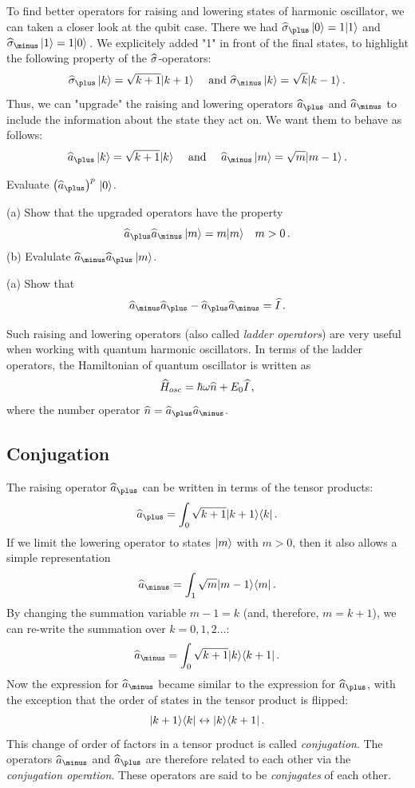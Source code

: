 To find better operators for raising and lowering states of harmonic oscillator, we can taken a closer look at the qubit case. There we had $\op{\sigma}_\plus\,\ket{0}=1\ket{1}$ and $\op{\sigma}_\minus\,\ket{1}=1\ket{0}$\,. We explicitely added "1" in front of the final states, to highlight the following property of the $\widehat{\sigma}$-operators:
\[
\op{\sigma}_\plus\,\ket{k}=\sqrt{k+1}\ket{k+1}\quad\textrm{ and } \op{\sigma}_\minus\,\ket{k}=\sqrt{k}\ket{k-1}\,.
\]
Thus, we can "upgrade" the raising and lowering operators $\op{a}_\plus$ and $\op{a}_\minus$ to include the information about the state they act on. We want them to behave as follows:
\[
\op{a}_\plus\,\ket{k}=\sqrt{k+1}\ket{k}\quad\textrm{ and }\quad \op{a}_\minus\,\ket{m}=\sqrt{m}\ket{m-1}\,.
\]
\begin{exercise}
	Evaluate $\left(\op{a}_\plus\right)^p\,\ket{0}$.
\end{exercise}
\begin{exercise}
	(a) Show that the upgraded operators have the property 
	\[
	\op{a}_\plus\op{a}_\minus\,\ket{m}=m\ket{m}\quad m>0\,.
	\]	
	(b) Evalulate $\op{a}_\minus\op{a}_\plus\,\ket{m}$.
\end{exercise}
\begin{exercise}
	(a) Show that 
	\[
	\op{a}_\minus\op{a}_\plus-\op{a}_\plus\op{a}_\minus=\op{I}\,.
	\]	
\end{exercise}

Such raising and lowering operators (also called \emph{ladder operators}) are very useful when working with quantum harmonic oscillators. In terms of the ladder operators, the Hamiltonian of quantum oscillator is written as
\[
\widehat{H}_{osc} = \hbar\omega\widehat{n}+E_0\widehat{I}\,,
\]
where the number operator $\op{n}=\op{a}_\plus\op{a}_\minus$. 


\subsection{Conjugation}
The raising operator $\op{a}_\plus$ can be written in terms of the tensor products:
\[
\op{a}_\plus=\int_0 \sqrt{k+1}\ketbra{k+1}{k}\,.
\]
If we limit the lowering operator to states $|{m}\rangle$ with $m>0$, then it also allows a simple representation
\[
\op{a}_\minus=\int_1 \sqrt{m}\ketbra{m-1}{m}\,.
\]
By changing the summation variable $m-1=k$ (and, therefore, $m=k+1$), we can re-write the summation over $k=0,1,2\ldots$:
\[
\op{a}_\minus=\int_0 \sqrt{k+1}\ketbra{k}{k+1}\,.
\]
Now the expression for $\op{a}_\minus$ became similar to the expression for $\op{a}_\plus$, with the exception that the order of states in the tensor product is flipped:
\[
|{k+1}\rangle\langle{k}|\leftrightarrow |{k}\rangle\langle{k+1}|\,.
\]
This change of order of factors in a tensor product is called \emph{conjugation}. The operators $\op{a}_\minus$ and $\op{a}_\plus$ are therefore related to each other via the \emph{conjugation operation}. These operators are said to be \emph{conjugates} of each other. 


